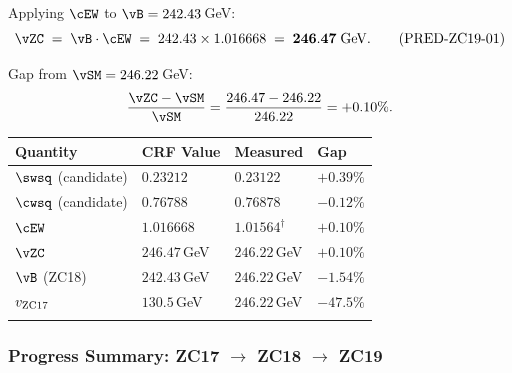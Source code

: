 \documentclass[12pt, a4paper]{article}
\begin{document}
\begin{derivedbox}[title={ZC19 Higgs VEV Prediction (Candidate)}]
Applying $\cEW$ to $\vB = 242.43$\,GeV:
\begin{equation}
  \vZC \;=\; \vB \cdot \cEW
  \;=\; 242.43 \times 1.016668
  \;=\; \mathbf{246.47\;\mathrm{GeV}}.
  \tag{PRED-ZC19-01}
\end{equation}

Gap from $\vSM = 246.22$\,GeV:
\[
  \frac{\vZC - \vSM}{\vSM}
  = \frac{246.47 - 246.22}{246.22}
  = +0.10\%.
\]

\medskip
\begin{center}
{\small
\renewcommand{\arraystretch}{1.35}
\begin{tabular}{>{\raggedright\arraybackslash}p{4.5cm}
                >{\centering\arraybackslash}p{2.8cm}
                >{\centering\arraybackslash}p{2.8cm}
                >{\centering\arraybackslash}p{2.5cm}}
\toprule
\textbf{Quantity} & \textbf{CRF Value} & \textbf{Measured} & \textbf{Gap} \\
\midrule
$\swsq$ (candidate) & $0.23212$ & $0.23122$ & $+0.39\%$ \\
$\cwsq$ (candidate) & $0.76788$ & $0.76878$ & $-0.12\%$ \\
$\cEW$ & $1.016668$ & $1.01564^\dagger$ & $+0.10\%$ \\
$\vZC$ & $246.47$\,GeV & $246.22$\,GeV & $+0.10\%$ \\
\midrule
$\vB$ (ZC18) & $242.43$\,GeV & $246.22$\,GeV & $-1.54\%$ \\
$v_{\rm ZC17}$ & $130.5$\,GeV & $246.22$\,GeV & $-47.5\%$ \\
\bottomrule
\multicolumn{4}{l}{\small $^\dagger$ Inferred from $\vSM/\vB = 246.22/242.43 = 1.01564$.}
\end{tabular}
}
\end{center}
\end{derivedbox}

\subsubsection{Progress Summary: ZC17 $\to$ ZC18 $\to$ ZC19}
\end{document}
